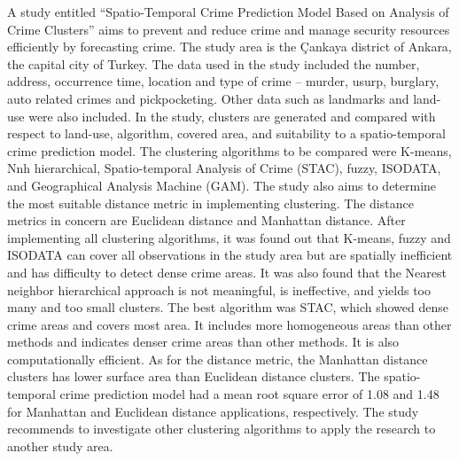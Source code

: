     A study entitled “Spatio-Temporal Crime Prediction Model Based on Analysis of Crime Clusters” \citep{polat2007spatio} aims to prevent and reduce crime and manage security resources efficiently by forecasting crime. The study area is the Çankaya district of Ankara, the capital city of Turkey. The data used in the study included the number, address, occurrence time, location and type of crime – murder, usurp, burglary, auto related crimes and pickpocketing. Other data such as landmarks and land-use were also included. In the study, clusters are generated and compared with respect to land-use, algorithm, covered area, and suitability to a spatio-temporal crime prediction model. The clustering algorithms to be compared were K-means, Nnh hierarchical, Spatio-temporal Analysis of Crime (STAC), fuzzy, ISODATA, and Geographical Analysis Machine (GAM). The study also aims to determine the most suitable distance metric in implementing clustering. The distance metrics in concern are Euclidean distance and Manhattan distance. After implementing all clustering algorithms, it was found out that K-means, fuzzy and ISODATA can cover all observations in the study area but are spatially inefficient and has difficulty to detect dense crime areas. It was also found that the Nearest neighbor hierarchical approach is not meaningful, is ineffective, and yields too many and too small clusters. The best algorithm was STAC, which showed dense crime areas and covers most area. It includes more homogeneous areas than other methods and indicates denser crime areas than other methods. It is also computationally efficient. As for the distance metric, the Manhattan distance clusters has lower surface area than Euclidean distance clusters. The spatio-temporal crime prediction model had a mean root square error of 1.08 and 1.48 for Manhattan and Euclidean distance applications, respectively. The study recommends to investigate other clustering algorithms to apply the research to another study area.


